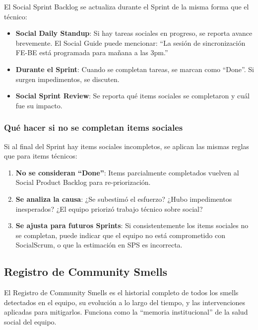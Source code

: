 El Social Sprint Backlog se actualiza durante el Sprint de la misma forma que el técnico:

\begin{itemize}
    \item \textbf{Social Daily Standup}: Si hay tareas sociales en progreso, se reporta avance brevemente. El Social Guide puede mencionar: ``La sesión de sincronización FE-BE está programada para mañana a las 3pm.''

    \item \textbf{Durante el Sprint}: Cuando se completan tareas, se marcan como ``Done''. Si surgen impedimentos, se discuten.

    \item \textbf{Social Sprint Review}: Se reporta qué items sociales se completaron y cuál fue su impacto.
\end{itemize}

\subsubsection{Qué hacer si no se completan items sociales}

Si al final del Sprint hay items sociales incompletos, se aplican las mismas reglas que para items técnicos:

\begin{enumerate}
    \item \textbf{No se consideran ``Done''}: Items parcialmente completados vuelven al Social Product Backlog para re-priorización.

    \item \textbf{Se analiza la causa}: ¿Se subestimó el esfuerzo? ¿Hubo impedimentos inesperados? ¿El equipo priorizó trabajo técnico sobre social?

    \item \textbf{Se ajusta para futuros Sprints}: Si consistentemente los items sociales no se completan, puede indicar que el equipo no está comprometido con SocialScrum, o que la estimación en SPS es incorrecta.
\end{enumerate}

\subsection{Registro de Community Smells}

El Registro de Community Smells es el historial completo de todos los smells detectados en el equipo, su evolución a lo largo del tiempo, y las intervenciones aplicadas para mitigarlos. Funciona como la ``memoria institucional'' de la salud social del equipo.

